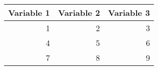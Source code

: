 \begin{tabular}{ r r r }
	Variable 1 & Variable 2 & Variable 3 \\
	\hline
	1 & 2 & 3 \\
	4 & 5 & 6 \\
	7 & 8 & 9 \\
\end{tabular}